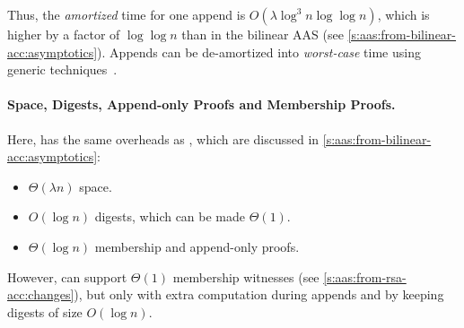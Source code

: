 Thus, the \textit{amortized} time for one append is $O(\lambda \log^3 {n}\log\log{n})$, which is higher by a factor of $\log\log{n}$ than in the bilinear AAS (see \cref{s:aas:from-bilinear-acc:asymptotics}).
Appends can be de-amortized into \textit{worst-case} time using generic techniques~\cite{overmars,overmars-van-leeuwen}.

\paragraph{Space, Digests, Append-only Proofs and Membership Proofs.}
Here, \rsaaas has the same overheads as \biaas, which are discussed in \cref{s:aas:from-bilinear-acc:asymptotics}:
\begin{itemize}
    \item $\Theta(\lambda n)$ space.
    \item $O(\log{n})$ digests, which can be made $\Theta(1)$.
    \item $\Theta(\log{n})$ membership and append-only proofs.
\end{itemize}
However, \rsaaas can support $\Theta(1)$ membership witnesses (see \cref{s:aas:from-rsa-acc:changes}), but only with extra computation during appends and by keeping digests of size $O(\log{n})$.

